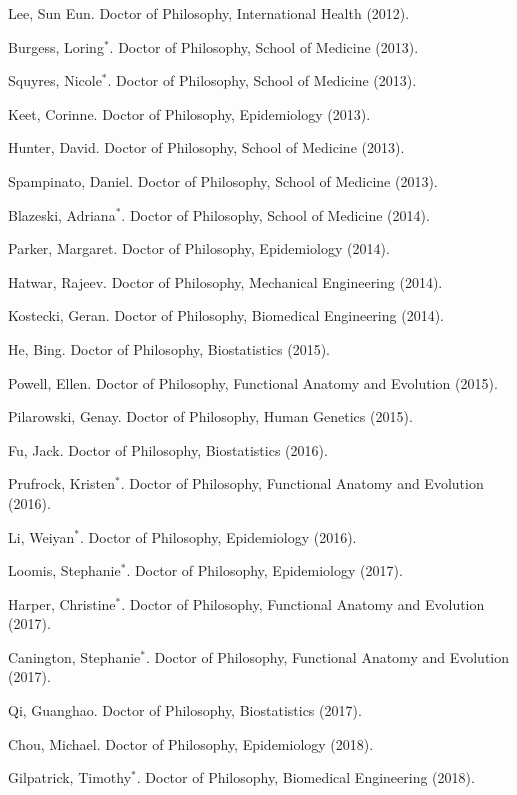 \documentclass[10pt]{article}
\newcommand{\dn}[1]{{\color{black} {#1}}}
\begin{document}
\item \dn{Lee}, Sun Eun. Doctor of Philosophy, International Health (2012).
\item \dn{Burgess}, Loring$^*$. Doctor of Philosophy, School of Medicine (2013).
\item \dn{Squyres}, Nicole$^*$. Doctor of Philosophy, School of Medicine (2013).
\item \dn{Keet}, Corinne. Doctor of Philosophy, Epidemiology (2013).
\item \dn{Hunter}, David. Doctor of Philosophy, School of Medicine (2013).
\item \dn{Spampinato}, Daniel. Doctor of Philosophy, School of Medicine (2013).
\item \dn{Blazeski}, Adriana$^*$. Doctor of Philosophy, School of Medicine (2014).
\item \dn{Parker}, Margaret. Doctor of Philosophy, Epidemiology (2014).
\item \dn{Hatwar}, Rajeev. Doctor of Philosophy, Mechanical Engineering (2014).
\item \dn{Kostecki}, Geran. Doctor of Philosophy, Biomedical Engineering (2014).
\item \dn{He}, Bing. Doctor of Philosophy, Biostatistics (2015).
\item \dn{Powell}, Ellen. Doctor of Philosophy, Functional Anatomy and Evolution (2015).
\item \dn{Pilarowski}, Genay. Doctor of Philosophy, Human Genetics (2015).
\item \dn{Fu}, Jack. Doctor of Philosophy, Biostatistics (2016).
\item \dn{Prufrock}, Kristen$^*$. Doctor of Philosophy, Functional Anatomy and Evolution (2016).
\item \dn{Li}, Weiyan$^*$. Doctor of Philosophy, Epidemiology (2016).
\item \dn{Loomis}, Stephanie$^*$. Doctor of Philosophy, Epidemiology (2017).
\item \dn{Harper}, Christine$^*$. Doctor of Philosophy, Functional Anatomy and Evolution (2017).
\item \dn{Canington}, Stephanie$^*$. Doctor of Philosophy, Functional Anatomy and Evolution (2017).
\item \dn{Qi}, Guanghao. Doctor of Philosophy, Biostatistics (2017).
\item \dn{Chou}, Michael. Doctor of Philosophy, Epidemiology (2018).
\item \dn{Gilpatrick}, Timothy$^*$. Doctor of Philosophy, Biomedical Engineering (2018).
\end{document}
